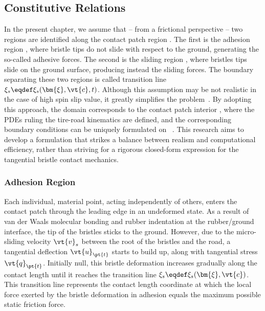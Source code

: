 
\subsection{Constitutive Relations}
\label{app3:sec:constitutive_relations}

In the present chapter, we assume that -- from a frictional perspective -- two regions are identified along the contact patch region \cp{}. The first is the adhesion region \adh{}, where bristle tips do not slide with respect to the ground, generating the so-called adhesive forces. The second is the sliding region \sli{}, where bristles tips slide on the ground surface, producing instead the sliding forces. The boundary separating these two regions is called transition line $\xi_s \eqdef \xi_s(\bm{\xi},\vt{c},t)$. Although this assumption may be not realistic in the case of high spin slip value, it greatly simplifies the problem~\cite{romano2022advanced}. By adopting this approach, the domain corresponds to the contact patch interior , where the \acp{PDE} ruling the tire-road kinematics are defined, and the corresponding boundary conditions can be uniquely formulated on ~\cite{romano2022analytical}. This research aims to develop a formulation that strikes a balance between realism and computational efficiency, rather than striving for a rigorous closed-form expression for the tangential bristle contact mechanics.

\subsubsection{Adhesion Region}

Each individual, material point, acting independently of others,  enters the contact patch through the leading edge in an undeformed state.  As a result of van der Waals molecular bonding
and rubber indentation
at the rubber/ground interface, the tip of the bristles sticks to the ground. However, due to the micro-sliding velocity $\vt{v}_s$ between the root of the bristles and the road, a tangential deflection $\vt{u}_{\pt{t}}$ starts to build up, along with tangential stress $\vt{q}_{\pt{t}}$. Initially null, this bristle deformation increases gradually along the contact length until it reaches the transition line $\xi_s \eqdef \xi_s(\bm{\xi},\vt{c})$. This transition line represents the contact length coordinate at which the local force exerted by the bristle deformation in adhesion equals the maximum possible static friction force.

